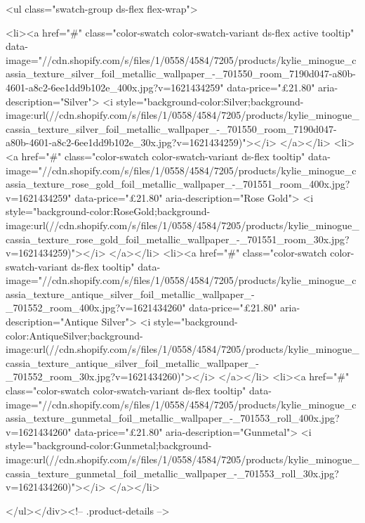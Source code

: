 {{{{{{{<ul class="swatch-group ds-flex flex-wrap">
        
<li><a href="#" class="color-swatch color-swatch-variant ds-flex active tooltip" data-image="//cdn.shopify.com/s/files/1/0558/4584/7205/products/kylie_minogue_cassia_texture_silver_foil_metallic_wallpaper_-_701550_room_7190d047-a80b-4601-a8c2-6ee1dd9b102e_400x.jpg?v=1621434259" data-price="£21.80" aria-description="Silver">
              <i style="background-color:Silver;background-image:url(//cdn.shopify.com/s/files/1/0558/4584/7205/products/kylie_minogue_cassia_texture_silver_foil_metallic_wallpaper_-_701550_room_7190d047-a80b-4601-a8c2-6ee1dd9b102e_30x.jpg?v=1621434259)"></i>
            </a></li>
<li><a href="#" class="color-swatch color-swatch-variant ds-flex tooltip" data-image="//cdn.shopify.com/s/files/1/0558/4584/7205/products/kylie_minogue_cassia_texture_rose_gold_foil_metallic_wallpaper_-_701551_room_400x.jpg?v=1621434259" data-price="£21.80" aria-description="Rose Gold">
              <i style="background-color:RoseGold;background-image:url(//cdn.shopify.com/s/files/1/0558/4584/7205/products/kylie_minogue_cassia_texture_rose_gold_foil_metallic_wallpaper_-_701551_room_30x.jpg?v=1621434259)"></i>
            </a></li>
<li><a href="#" class="color-swatch color-swatch-variant ds-flex tooltip" data-image="//cdn.shopify.com/s/files/1/0558/4584/7205/products/kylie_minogue_cassia_texture_antique_silver_foil_metallic_wallpaper_-_701552_room_400x.jpg?v=1621434260" data-price="£21.80" aria-description="Antique Silver">
              <i style="background-color:AntiqueSilver;background-image:url(//cdn.shopify.com/s/files/1/0558/4584/7205/products/kylie_minogue_cassia_texture_antique_silver_foil_metallic_wallpaper_-_701552_room_30x.jpg?v=1621434260)"></i>
            </a></li>
<li><a href="#" class="color-swatch color-swatch-variant ds-flex tooltip" data-image="//cdn.shopify.com/s/files/1/0558/4584/7205/products/kylie_minogue_cassia_texture_gunmetal_foil_metallic_wallpaper_-_701553_roll_400x.jpg?v=1621434260" data-price="£21.80" aria-description="Gunmetal">
              <i style="background-color:Gunmetal;background-image:url(//cdn.shopify.com/s/files/1/0558/4584/7205/products/kylie_minogue_cassia_texture_gunmetal_foil_metallic_wallpaper_-_701553_roll_30x.jpg?v=1621434260)"></i>
            </a></li>

      </ul></div><!-- .product-details -->

}}}}}}}
